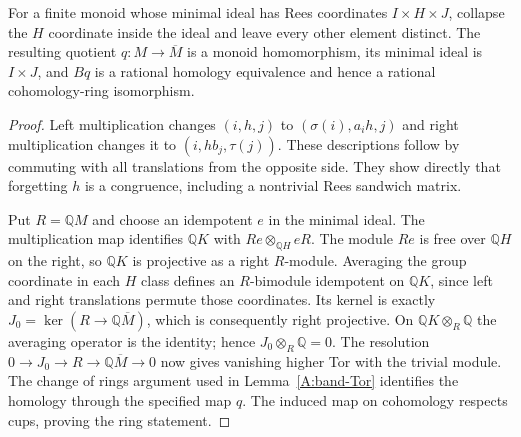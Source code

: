 \begin{lemma}
\label{A:minimal-group-collapse}
For a finite monoid whose minimal ideal has Rees coordinates
$I\times H\times J$, collapse the $H$ coordinate inside the
ideal and leave every other element distinct. The resulting
quotient $q:M\to\overline M$ is a monoid homomorphism, its
minimal ideal is $I\times J$, and $Bq$ is a rational homology
equivalence and hence a rational cohomology-ring isomorphism.
\end{lemma}
\begin{proof}
Left multiplication changes $(i,h,j)$ to
$(\sigma(i),a_i h,j)$ and right multiplication changes it to
$(i,hb_j,\tau(j))$. These descriptions follow by commuting with
all translations from the opposite side. They show directly
that forgetting $h$ is a congruence, including a nontrivial
Rees sandwich matrix.

Put $R=\mathbb QM$ and choose an idempotent $e$ in the minimal
ideal. The multiplication map identifies
$\mathbb QK$ with $Re\otimes_{\mathbb QH}eR$.
The module $Re$ is free over $\mathbb QH$ on the right, so
$\mathbb QK$ is projective as a right $R$-module. Averaging
the group coordinate in each $H$ class defines an $R$-bimodule
idempotent on $\mathbb QK$, since left and right translations
permute those coordinates. Its kernel is exactly
$J_0=\ker(R\to\mathbb Q\overline M)$, which is consequently
right projective. On $\mathbb QK\otimes_R\mathbb Q$ the
averaging operator is the identity; hence
$J_0\otimes_R\mathbb Q=0$. The resolution
$0\to J_0\to R\to\mathbb Q\overline M\to0$ now gives
vanishing higher Tor with the trivial module. The change of
rings argument used in Lemma~\ref{A:band-Tor} identifies the
homology through the specified map $q$. The induced map on
cohomology respects cups, proving the ring statement.
\end{proof}

